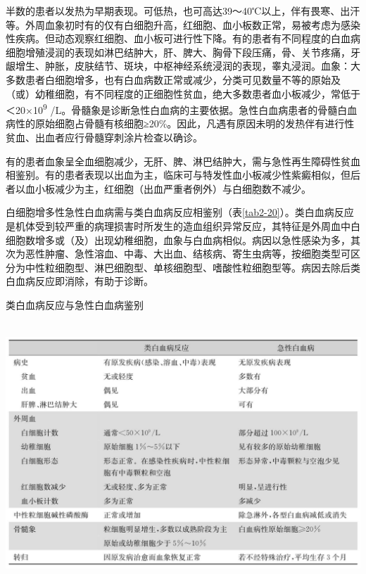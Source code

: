 半数的患者以发热为早期表现。可低热，也可高达39～40℃以上，伴有畏寒、出汗等。外周血象初时有的仅有白细胞升高，红细胞、血小板数正常，易被考虑为感染性疾病。但动态观察红细胞、血小板可进行性下降。有的患者有不同程度的白血病细胞增殖浸润的表现如淋巴结肿大，肝、脾大、胸骨下段压痛，骨、关节疼痛，牙龈增生、肿胀，皮肤结节、斑块，中枢神经系统浸润的表现，睾丸浸润。血象：大多数患者白细胞增多，也有白血病数正常或减少，分类可见数量不等的原始及（或）幼稚细胞，有不同程度的正细胞性贫血，绝大多数患者血小板减少，常低于＜20×10\textsuperscript{9}
/L。骨髓象是诊断急性白血病的主要依据。急性白血病患者的骨髓白血病性的原始细胞占骨髓有核细胞≥20\%。因此，凡遇有原因未明的发热伴有进行性贫血、出血者应行骨髓穿刺涂片检查以确诊。

有的患者血象呈全血细胞减少，无肝、脾、淋巴结肿大，需与急性再生障碍性贫血相鉴别。有的患者表现以出血为主，临床可与特发性血小板减少性紫癜相似，但后者以血小板减少为主，红细胞（出血严重者例外）与白细胞数不减少。

白细胞增多性急性白血病需与类白血病反应相鉴别（表\ref{tab2-20}）。类白血病反应是机体受到较严重的病理损害时所发生的造血组织异常反应，其特征是外周血中白细胞数增多或（及）出现幼稚细胞，血象与白血病相似。病因以急性感染为多，其次为恶性肿瘤、急性溶血、中毒、大出血、结核病、寄生虫病等，按细胞类型可区分为中性粒细胞型、淋巴细胞型、单核细胞型、嗜酸性粒细胞型等。病因去除后类白血病反应即消除，有助于诊断。

\begin{table}[htbp]
\centering
\caption{类白血病反应与急性白血病鉴别}
\label{tab2-20}
\includegraphics[width=5.91667in,height=3.875in]{./images/Image00026.jpg}
\end{table}

